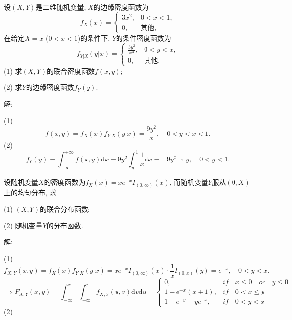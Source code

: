 \documentclass[standard]{ExBook}
\renewenvironment{shaded}{%
  \def\FrameCommand{\fboxsep=\FrameSep \colorbox{shadecolor}}%
  \MakeFramed{\advance\hsize-\width \FrameRestore}%
}{%
  \endMakeFramed
}
\begin{document}
\begin{qitems}
\vspace{2.5cm-5em}

    \begin{bbox}
    \begin{shaded}
        \qitem
设$(X,Y)$是二维随机变量, $X$的边缘密度函数为
$$
    f_{X}(x)=
    \left\{
    \begin{array}{ll}
        3x^2, & 0 < x < 1,\\
        0, & \text{其他},
    \end{array}
    \right.
$$
在给定$X=x$ ($0 < x < 1$)的条件下, $Y$的条件密度函数为
$$
    f_{Y|X}(y|x)=
    \left\{
    \begin{array}{ll}
        \displaystyle\frac{3y^2}{x^3}, & 0 < y < x,\\
        0, & \text{其他}.
    \end{array}
    \right.
$$
(1) 求$(X,Y)$的联合密度函数$f(x,y)$;

(2) 求$Y$的边缘密度函数$f_{Y}(y)$.
    \end{shaded}
    \end{bbox}

\vspace{\dimexpr2.5cm-5em\relax}

解: 

(1)
$$f(x,y)=f_{X}(x)f_{Y|X}(y|x)=\displaystyle\frac{9y^2}{x},\quad 0<y<x<1.$$
(2)
$$f_{Y}(y)=\displaystyle\int_{-\infty}^{+\infty}f(x,y)\mathrm{d}x=9y^2\int_{y}^{1}\frac{1}{x}\mathrm{d}x=-9y^2\ln y,\quad 0<y<1.$$

\vspace{2.5cm-5em}

    \begin{bbox}
    \begin{shaded}
        \qitem
设随机变量$X$的密度函数为$f_{X}(x)=x e^{-x}I_{(0,\infty)}(x)$, 而随机变量$Y$服从$(0,X)$上的均匀分布, 求

(1) $(X,Y)$的联合分布函数;

(2) 随机变量$Y$的分布函数.
    \end{shaded}
    \end{bbox}

\vspace{\dimexpr2.5cm-5em\relax}

解: 

(1)
$$f_{X,Y}(x,y)=f_{X}(x)f_{Y|X}(y|x)=x e^{-x}I_{(0,\infty)}(x)\cdot \frac{1}{x}I_{(0,x)}(y)=e^{-x},\quad 0<y<x.$$
$$
    \Longrightarrow
    F_{X,Y}(x,y)=\displaystyle\int_{-\infty}^{x}\int_{-\infty}^{y}f_{X,Y}(u,v)\mathrm{d}v\mathrm{d}u=
    \left\{
    \begin{array}{ll}
        0, & if\quad x\leq0\quad or\quad y\leq0\\
        1-e^{-x}(x+1), & if\quad 0<x\leq y\\
        1-e^{-y}-ye^{-x}, & if\quad 0<y<x
    \end{array}
    \right.
$$
(2)


\end{qitems}
\end{document}
